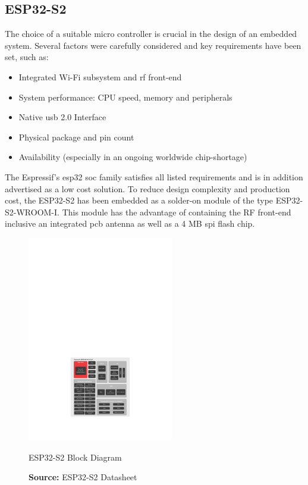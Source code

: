\subsection{ESP32-S2}
The choice of a suitable micro controller is crucial in the design of an embedded system. Several factors were carefully considered and key requirements have been set, such as:

\begin{itemize}
		\item Integrated Wi-Fi subsystem and \acrshort{rf} front-end
		\item System performance: CPU speed, memory and peripherals
		\item Native \acrshort{usb} 2.0 Interface
		\item Physical package and pin count
		\item Availability (especially in an ongoing worldwide chip-shortage)
\end{itemize}

The Espressif's \gls{esp32} \acrfull{soc} family satisfies all listed requirements and is in addition advertised as a low cost solution.\newline
To reduce design complexity and production cost, the ESP32-S2 has been embedded as a solder-on module of the type ESP32-S2-WROOM-I. This module has the advantage of containing the RF front-end inclusive an integrated \acrshort{pcb} antenna as well as a 4 MB \acrshort{spi} flash chip.\newline

\begin{figure}[h!]
	\centering
	\includegraphics[height=9cm]{images/esp32-s2_block_diagram}
	\caption{ESP32-S2 Block Diagram}
	\vspace{-1.4ex}
	\caption*{\textbf{Source:} ESP32-S2 Datasheet \cite{esp32-s2_datasheet}}
	\label{fig:esp32-s2_block_diagram}
\end{figure}

